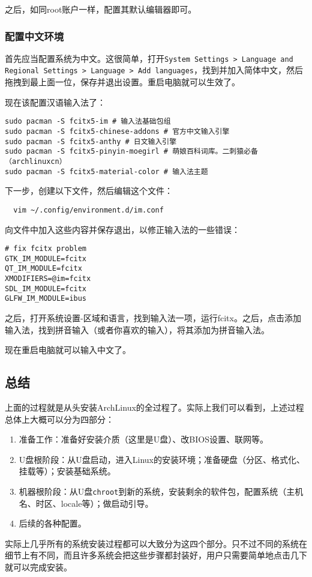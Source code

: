 \documentclass[../main.tex]{subfiles}
\begin{document}
之后，如同root账户一样，配置其默认编辑器即可。

\subsubsection{配置中文环境}

首先应当配置系统为中文。这很简单，打开\texttt{System Settings > Language and Regional Settings > Language > Add languages}，找到并加入简体中文，然后拖拽到最上面一位，保存并退出设置。重启电脑就可以生效了。

现在该配置汉语输入法了：
\begin{lstlisting}
sudo pacman -S fcitx5-im # 输入法基础包组
sudo pacman -S fcitx5-chinese-addons # 官方中文输入引擎
sudo pacman -S fcitx5-anthy # 日文输入引擎
sudo pacman -S fcitx5-pinyin-moegirl # 萌娘百科词库。二刺猿必备（archlinuxcn）
sudo pacman -S fcitx5-material-color # 输入法主题
\end{lstlisting}
下一步，创建以下文件，然后编辑这个文件：
\begin{lstlisting}
  vim ~/.config/environment.d/im.conf
\end{lstlisting}
向文件中加入这些内容并保存退出，以修正输入法的一些错误：
\begin{lstlisting}
# fix fcitx problem
GTK_IM_MODULE=fcitx
QT_IM_MODULE=fcitx
XMODIFIERS=@im=fcitx
SDL_IM_MODULE=fcitx
GLFW_IM_MODULE=ibus
\end{lstlisting}
之后，打开系统设置-区域和语言，找到输入法一项，运行fcitx。之后，点击添加输入法，找到拼音输入（或者你喜欢的输入），将其添加为拼音输入法。

现在重启电脑就可以输入中文了。

\subsection{总结}

上面的过程就是从头安装ArchLinux的全过程了。实际上我们可以看到，上述过程总体上大概可以分为四部分：
\begin{enumerate}
  \item 准备工作：准备好安装介质（这里是U盘）、改BIOS设置、联网等。
  \item U盘根阶段：从U盘启动，进入Linux的安装环境；准备硬盘（分区、格式化、挂载等）；安装基础系统。
  \item 机器根阶段：从U盘\texttt{chroot}到新的系统，安装剩余的软件包，配置系统（主机名、时区、locale等）；做启动引导。
  \item 后续的各种配置。
\end{enumerate}
实际上几乎所有的系统安装过程都可以大致分为这四个部分。只不过不同的系统在细节上有不同，而且许多系统会把这些步骤都封装好，用户只需要简单地点击几下就可以完成安装。
\end{document}
